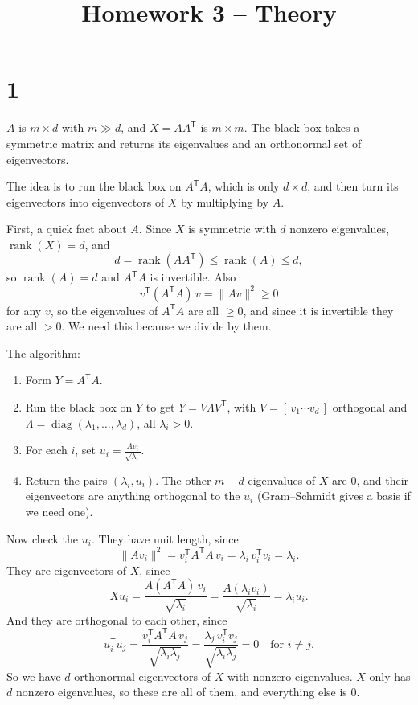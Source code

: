 \documentclass[11pt]{article}
\title{Homework 3 -- Theory}
\author{}
\date{}
\newcommand{\T}{\mathsf{T}}
\DeclareMathOperator{\rank}{rank}
\DeclareMathOperator{\diag}{diag}
\begin{document}
\maketitle

\section*{1}

$A$ is $m \times d$ with $m \gg d$, and $X = AA^\T$ is $m \times m$. The black box takes a symmetric matrix and returns its eigenvalues and an orthonormal set of eigenvectors.

The idea is to run the black box on $A^\T A$, which is only $d \times d$, and then turn its eigenvectors into eigenvectors of $X$ by multiplying by $A$.

First, a quick fact about $A$. Since $X$ is symmetric with $d$ nonzero eigenvalues, $\rank(X) = d$, and
\[
  d = \rank(AA^\T) \le \rank(A) \le d ,
\]
so $\rank(A) = d$ and $A^\T A$ is invertible. Also
\[
  v^\T (A^\T A)\, v = \|Av\|^2 \ge 0
\]
for any $v$, so the eigenvalues of $A^\T A$ are all $\ge 0$, and since it is invertible they are all $> 0$. We need this because we divide by them.

The algorithm:
\begin{enumerate}[leftmargin=2em]
  \item Form $Y = A^\T A$.
  \item Run the black box on $Y$ to get $Y = V \Lambda V^\T$, with $V = [\,v_1 \cdots v_d\,]$ orthogonal and $\Lambda = \diag(\lambda_1, \dots, \lambda_d)$, all $\lambda_i > 0$.
  \item For each $i$, set $\displaystyle u_i = \frac{A v_i}{\sqrt{\lambda_i}}$.
  \item Return the pairs $(\lambda_i, u_i)$. The other $m - d$ eigenvalues of $X$ are $0$, and their eigenvectors are anything orthogonal to the $u_i$ (Gram--Schmidt gives a basis if we need one).
\end{enumerate}

Now check the $u_i$. They have unit length, since
\[
  \|A v_i\|^2 = v_i^\T A^\T A\, v_i = \lambda_i\, v_i^\T v_i = \lambda_i .
\]
They are eigenvectors of $X$, since
\[
  X u_i = \frac{A (A^\T A)\, v_i}{\sqrt{\lambda_i}} = \frac{A (\lambda_i v_i)}{\sqrt{\lambda_i}} = \lambda_i u_i .
\]
And they are orthogonal to each other, since
\[
  u_i^\T u_j = \frac{v_i^\T A^\T A\, v_j}{\sqrt{\lambda_i \lambda_j}}
             = \frac{\lambda_j\, v_i^\T v_j}{\sqrt{\lambda_i \lambda_j}}
             = 0 \quad \text{for } i \ne j .
\]
So we have $d$ orthonormal eigenvectors of $X$ with nonzero eigenvalues. $X$ only has $d$ nonzero eigenvalues, so these are all of them, and everything else is $0$.
\end{document}
